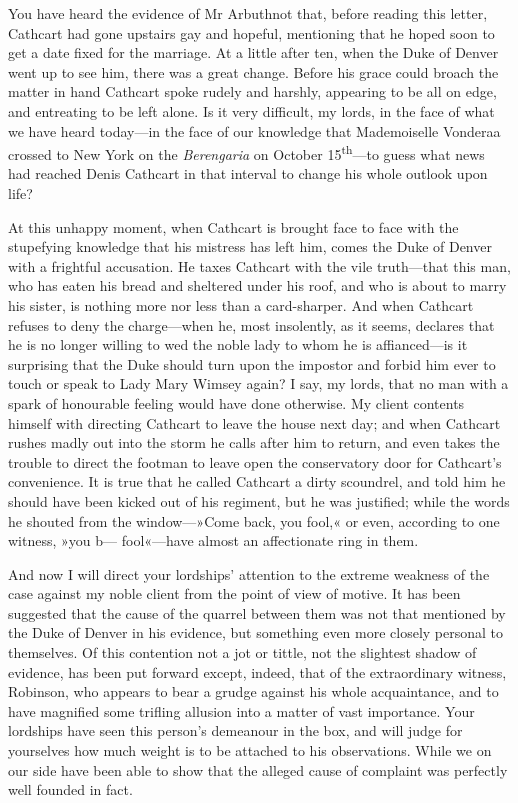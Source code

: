 \begin{dialogue}
\smallskip 

You have heard the evidence of Mr Arbuthnot that, before reading this letter, Cathcart had gone upstairs gay and hopeful, mentioning that he hoped soon to get a date fixed for the marriage. At a little after ten, when the Duke of Denver went up to see him, there was a great change. Before his grace could broach the matter in hand Cathcart spoke rudely and harshly, appearing to be all on edge, and entreating to be left alone. Is it very difficult, my lords, in the face of what we have heard today—in the face of our knowledge that Mademoiselle Vonderaa crossed to New York on the \textit{Berengaria} on October 15\textsuperscript{th}—to guess what news had reached Denis Cathcart in that interval to change his whole outlook upon life?

\smallskip 

At this unhappy moment, when Cathcart is brought face to face with the stupefying knowledge that his mistress has left him, comes the Duke of Denver with a frightful accusation. He taxes Cathcart with the vile truth—that this man, who has eaten his bread and sheltered under his roof, and who is about to marry his sister, is nothing more nor less than a card-sharper. And when Cathcart refuses to deny the charge—when he, most insolently, as it seems, declares that he is no longer willing to wed the noble lady to whom he is affianced—is it surprising that the Duke should turn upon the impostor and forbid him ever to touch or speak to Lady Mary Wimsey again? I say, my lords, that no man with a spark of honourable feeling would have done otherwise. My client contents himself with directing Cathcart to leave the house next day; and when Cathcart rushes madly out into the storm he calls after him to return, and even takes the trouble to direct the footman to leave open the conservatory door for Cathcart's convenience. It is true that he called Cathcart a dirty scoundrel, and told him he should have been kicked out of his regiment, but he was justified; while the words he shouted from the window—»Come back, you fool,« or even, according to one witness, »you b— fool«—have almost an affectionate ring in them. 

\smallskip 

And now I will direct your lordships' attention to the extreme weakness of the case against my noble client from the point of view of motive. It has been suggested that the cause of the quarrel between them was not that mentioned by the Duke of Denver in his evidence, but something even more closely personal to themselves. Of this contention not a jot or tittle, not the slightest shadow of evidence, has been put forward except, indeed, that of the extraordinary witness, Robinson, who appears to bear a grudge against his whole acquaintance, and to have magnified some trifling allusion into a matter of vast importance. Your lordships have seen this person's demeanour in the box, and will judge for yourselves how much weight is to be attached to his observations. While we on our side have been able to show that the alleged cause of complaint was perfectly well founded in fact.


\end{dialogue}
